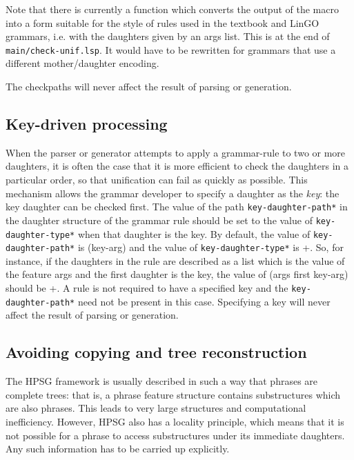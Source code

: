 \documentclass[12pt]{report}
\newcommand{\filename}[1]{{\tt #1}}
\newcommand{\lkbparam}[1]{{\tt #1}}
\newcommand{\newterm}[1]{{\it #1}}
\begin{document}
Note that there is currently a function which converts the 
output of the macro into a form suitable for the style of
rules used in the textbook and LinGO grammars, i.e.
with the daughters given by an {\feature args} list.  This is
at the end of \filename{main/check-unif.lsp}.  It would
have to be rewritten for grammars that use a different
mother/daughter encoding.

The checkpaths will never affect the result of 
parsing or generation.

\subsection{Key-driven processing}
\label{key-driven}

When the parser or generator attempts to apply a grammar-rule to
two or more daughters, it
is often the case that it is more efficient to check the daughters in a 
particular order, so that unification can fail as quickly as possible.
This mechanism allows the grammar developer to specify
a daughter as the \newterm{key}: the key daughter
can be checked first.
The value of the path \lkbparam{*key-daughter-path*} in the 
daughter structure of the grammar rule
should be set to the value of
\lkbparam{*key-daughter-type*} when that daughter is the key.
By default, the value of \lkbparam{*key-daughter-path*} is
({\sc key-arg}) and the value of \lkbparam{*key-daughter-type*} is {\type +}.
So, for instance, if the daughters in the rule are described as a list
which is the value of the feature {\sc args} and the
first daughter is the key, the value of ({\sc args} {\sc first} {\sc key-arg}) should be {\type +}.  A rule is not required to have a specified
key and the \lkbparam{*key-daughter-path*} need not be present
in this case.  Specifying a key will never affect the result of 
parsing or generation.

\subsection{Avoiding copying and tree reconstruction}
\label{deldaughters}

The HPSG framework is usually described in such a way that phrases are
complete trees: that is, a phrase feature structure
contains substructures which are also phrases.  This leads to 
very large structures and computational inefficiency.  However, HPSG
also has a locality principle, which means that it is not possible
for a phrase to access substructures under its immediate daughters.
Any such information has to be carried up explicitly.  
\end{document}
